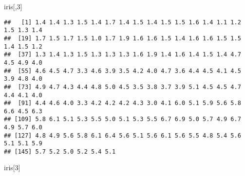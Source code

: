 \documentclass[]{article}
\newenvironment{Shaded}{\begin{snugshade}}{\end{snugshade}}
\newcommand{\DecValTok}[1]{\textcolor[rgb]{0.00,0.00,0.81}{#1}}
\newcommand{\NormalTok}[1]{#1}
\begin{document}
\begin{Shaded}
\begin{Highlighting}[]
\NormalTok{iris[,}\DecValTok{3}\NormalTok{]}
\end{Highlighting}
\end{Shaded}

\begin{verbatim}
##   [1] 1.4 1.4 1.3 1.5 1.4 1.7 1.4 1.5 1.4 1.5 1.5 1.6 1.4 1.1 1.2 1.5 1.3 1.4
##  [19] 1.7 1.5 1.7 1.5 1.0 1.7 1.9 1.6 1.6 1.5 1.4 1.6 1.6 1.5 1.5 1.4 1.5 1.2
##  [37] 1.3 1.4 1.3 1.5 1.3 1.3 1.3 1.6 1.9 1.4 1.6 1.4 1.5 1.4 4.7 4.5 4.9 4.0
##  [55] 4.6 4.5 4.7 3.3 4.6 3.9 3.5 4.2 4.0 4.7 3.6 4.4 4.5 4.1 4.5 3.9 4.8 4.0
##  [73] 4.9 4.7 4.3 4.4 4.8 5.0 4.5 3.5 3.8 3.7 3.9 5.1 4.5 4.5 4.7 4.4 4.1 4.0
##  [91] 4.4 4.6 4.0 3.3 4.2 4.2 4.2 4.3 3.0 4.1 6.0 5.1 5.9 5.6 5.8 6.6 4.5 6.3
## [109] 5.8 6.1 5.1 5.3 5.5 5.0 5.1 5.3 5.5 6.7 6.9 5.0 5.7 4.9 6.7 4.9 5.7 6.0
## [127] 4.8 4.9 5.6 5.8 6.1 6.4 5.6 5.1 5.6 6.1 5.6 5.5 4.8 5.4 5.6 5.1 5.1 5.9
## [145] 5.7 5.2 5.0 5.2 5.4 5.1
\end{verbatim}

\begin{Shaded}
\begin{Highlighting}[]
\NormalTok{iris[}\DecValTok{3}\NormalTok{]}
\end{Highlighting}
\end{Shaded}
\end{document}
